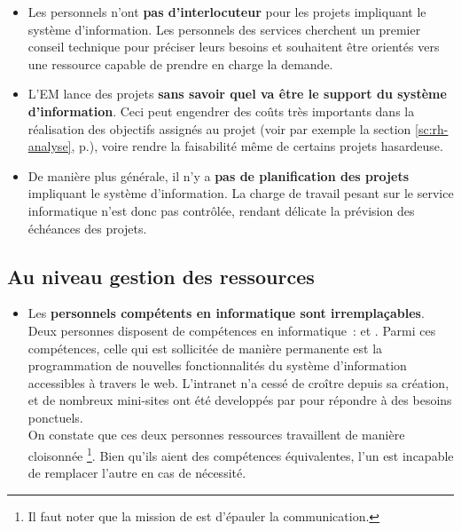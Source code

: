 \documentclass{book}
\begin{document}
\begin{itemize}
\item Les personnels n'ont \textbf{pas d'interlocuteur} pour les projets impliquant le système 
	d'information. Les personnels des services cherchent un premier conseil technique
	pour préciser leurs besoins et souhaitent être orientés vers une ressource
	capable de prendre en charge la demande.\\

\item L'EM lance des projets \textbf{sans savoir quel va être le support du système d'information}.
	Ceci peut engendrer des coûts très importants dans la réalisation des objectifs
	assignés au projet (voir par exemple la section \ref{sc:rh-analyse}, p.\pageref{sc:rh-analyse}),
	voire rendre la faisabilité même de certains projets hasardeuse.\\

\item De manière plus générale, il n'y a \textbf{pas de planification des projets} impliquant le 
	système d'information. La charge de travail pesant sur le service informatique n'est donc
	pas contrôlée, rendant délicate la prévision des échéances des projets.\\
\end{itemize}


\subsection{Au niveau gestion des ressources}

\begin{itemize}
\item Les \textbf{personnels compétents en informatique sont irremplaçables}.
Deux personnes disposent de compétences en informatique~: \CK et \NB. Parmi
ces compétences, celle qui est sollicitée de manière permanente est la programmation
de nouvelles fonctionnalités du système d'information accessibles à travers le web.
L'intranet n'a cessé de croître depuis sa création, et de nombreux mini-sites ont 
été developpés par \NB pour répondre à des besoins ponctuels.\\

On constate que ces deux personnes ressources travaillent de manière cloisonnée%
\footnote{Il faut noter que la mission de \NB est d'épauler la communication.}.
Bien qu'ils aient des compétences équivalentes, l'un est incapable de 
remplacer l'autre en cas de nécessité.
\end{itemize}
\end{document}
